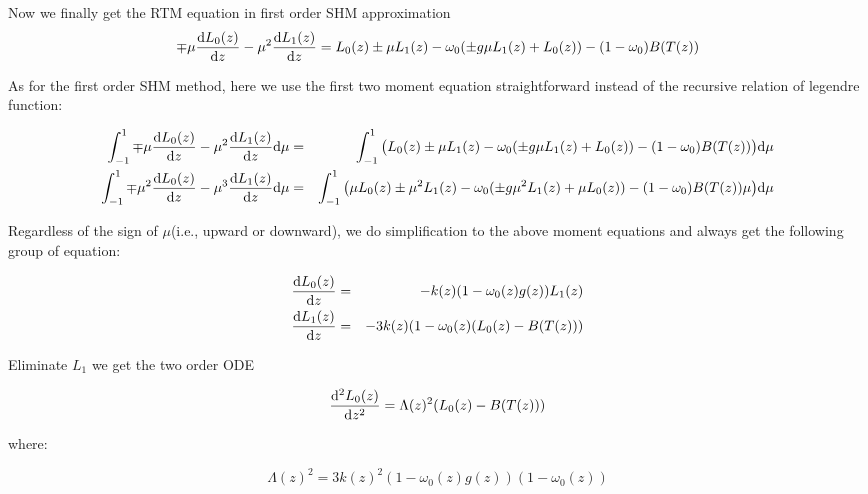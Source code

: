 \documentclass[a4paper]{report}
\begin{document}
Now we finally get the RTM equation in first order SHM approximation 
\begin{equation}
    \mp \mu \frac{\mathrm{d} L_{0}(z)}{\mathrm{d} z} - \mu^{2} \frac{\mathrm{d} L_{1}(z)}{\mathrm{d} z}
    = L_{0}(z) \pm \mu L_{1}(z) 
    - \omega_{0}(\pm g \mu L_{1}(z) + L_{0}(z))
    - (1-\omega_{0})B(T(z))
\end{equation}

As for the first order SHM method, here we use the first two moment equation straightforward 
instead of the recursive relation of legendre function:

\begin{eqnarray}
    \int_{-1}^{1}\mp \mu \frac{\mathrm{d} L_{0}(z)}{\mathrm{d} z} - \mu^{2} \frac{\mathrm{d} L_{1}(z)}{\mathrm{d} z} \mathrm{d} \mu
    & = & \int_{-1}^{1}
    \big(
        L_{0}(z) \pm \mu L_{1}(z) 
    - \omega_{0}(\pm g \mu L_{1}(z) + L_{0}(z))
    - (1-\omega_{0})B(T(z)) 
    \big) \mathrm{d} \mu \nonumber\\
    \int_{-1}^{1}\mp \mu^{2} \frac{\mathrm{d} L_{0}(z)}{\mathrm{d} z} - \mu^{3} \frac{\mathrm{d} L_{1}(z)}{\mathrm{d} z} \mathrm{d} \mu
    & = & \int_{-1}^{1}
    \big(
        \mu L_{0}(z) \pm \mu^{2} L_{1}(z) 
    - \omega_{0}(\pm g \mu^{2} L_{1}(z) + \mu L_{0}(z))
    - (1-\omega_{0})B(T(z)) \mu 
    \big) \mathrm{d} \mu \nonumber
\end{eqnarray}

Regardless of the sign of $\mu$(i.e., upward or downward), 
we do simplification to the above moment equations and always get the following group
of equation:

\begin{eqnarray} \label{eq:ODEs}
    \frac{\mathrm{d} L_{0}(z)}{\mathrm{d} z} & = & -k(z)(1-\omega_{0}(z)g(z))L_{1}(z) \nonumber\\
    \frac{\mathrm{d} L_{1}(z)}{\mathrm{d} z} & = & -3k(z)(1-\omega_{0}(z)(L_{0}(z) - B(T(z)))
\end{eqnarray}

Eliminate $L_{1}$ we get the two order ODE

\begin{equation} \label{eq:ODE}
    \frac{\mathrm{d}^{2}L_{0}(z)}{\mathrm{d} z ^{2}} = \Lambda(z)^{2}(L_{0}(z) - B(T(z)))
\end{equation}

where:

\begin{equation} \label{eq:Lamda}
    \Lambda(z)^{2} = 3k(z)^{2}(1-\omega_{0}(z)g(z))(1-\omega_{0}(z))
\end{equation}
\end{document}
